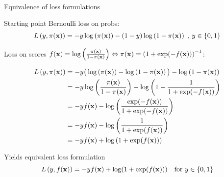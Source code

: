 \documentclass[11pt,compress,t,notes=noshow, xcolor=table]{beamer}
\begin{document}

\begin{framev}[fs=small]{Equivalence of loss formulations}

\begin{itemizeS}
\item Starting point Bernoulli loss on probs: 
$$
L\left(y, \pi(\mathbf{x})\right) = - y \log \left(\pi(\mathbf{x})\right) - (1 - y) \log \left(1 - \pi(\mathbf{x})\right)\,\,, \, y \in \{0, 1\}
$$

\item Loss on scores $f(\mathbf{x}) = \log\left(\frac{\pi(\mathbf{x})}{1 - \pi(\mathbf{x})}\right) \Leftrightarrow \pi(\mathbf{x}) = \left(1 + \exp(-f(\mathbf{x}))\right)^{-1}$:

\begin{align*}
L\left(y, \pi(\mathbf{x})\right) &= -y \big(\log \left(\pi(\mathbf{x})\right) - \log \left(1 - \pi(\mathbf{x})\right)\big) - \log \left(1 - \pi(\mathbf{x})\right) \\
&= -y \log\left(\frac{\pi(\mathbf{x})}{1-\pi(\mathbf{x})} \right) - \log \left(1-\frac{1}{1+ \exp(-f(\mathbf{x}))} \right) \\
&= -y f(\mathbf{x}) - \log \left(\frac{\exp(-f(\mathbf{x}))}{1+\exp(-f(\mathbf{x}))} \right) \\
&= -y f(\mathbf{x}) - \log \left(\frac{1}{1+\exp(f(\mathbf{x}))} \right) \\
&= -y f(\mathbf{x}) + \log \left(1+\exp(f(\mathbf{x})) \right) 
\end{align*}

\item Yields equivalent loss formulation
$$L\left(y, f(\mathbf{x})\right) = - y f(\mathbf{x}) + \log(1 + \exp(f(\mathbf{x}))) \quad \text{for } y \in \{0, 1\}$$
\end{itemizeS}

\end{framev}
\end{document}
